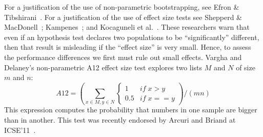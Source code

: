 \documentclass[smallcondesed]{svjour3}
\begin{document}
For a justification of the use of non-parametric
bootstrapping, see Efron \&
Tibshirani~\cite[p220-223]{efron93}.
For a justification of the use of effect size tests
see Shepperd \& MacDonell~\cite{shepperd12a}; Kampenes~\cite{kampenes07}; and
Kocaguneli et al.~\cite{kocharm13}. These researchers
warn that even if an
hypothesis test declares two populations to be
``significantly'' different, then that result is
misleading if the ``effect size'' is very small.
Hence, to assess 
the performance differences 
we first must rule out small effects.
Vargha and Delaney's
non-parametric 
A12 effect size test 
explores
two lists $M$ and $N$ of size $m$ and $n$:
\[A12 = \left(\sum_{x\in M, y \in N} 
\begin{cases} 
1   & \mathit{if}\; x > y\\
0.5 & \mathit{if}\; x == y
\end{cases}\right) / (mn)
\]
This expression computes the probability that numbers in one sample are bigger than in another.
This test was recently 
endorsed by Arcuri and Briand
at ICSE'11~\cite{arcuri11}.
\end{document}
